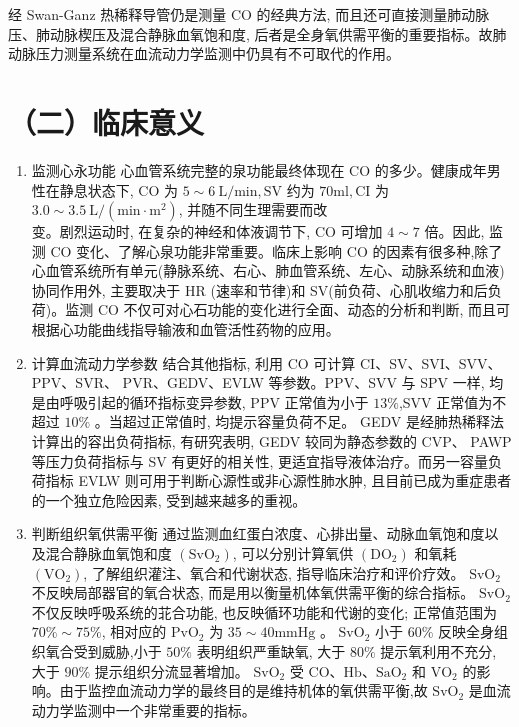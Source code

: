\documentclass[10pt]{article}
\begin{document}
经 Swan-Ganz 热稀释导管仍是测量 CO 的经典方法, 而且还可直接测量肺动脉压、肺动脉楔压及混合静脉血氧饱和度, 后者是全身氧供需平衡的重要指标。故肺动脉压力测量系统在血流动力学监测中仍具有不可取代的作用。

\section*{（二）临床意义}
\begin{enumerate}
  \item 监测心永功能 心血管系统完整的泉功能最终体现在 CO 的多少。健康成年男性在静息状态下, $\mathrm{CO}$ 为 $5 \sim 6 \mathrm{~L} / \mathrm{min}, \mathrm{SV}$ 约为 $70 \mathrm{ml}, \mathrm{CI}$ 为 $3.0 \sim 3.5 \mathrm{~L} /\left(\mathrm{min} \cdot \mathrm{m}^{2}\right)$, 并随不同生理需要而改\\
变。剧烈运动时, 在复杂的神经和体液调节下, CO 可增加 $4 \sim 7$ 倍。因此, 监测 CO 变化、了解心泉功能非常重要。临床上影响 CO 的因素有很多种,除了心血管系统所有单元(静脉系统、右心、肺血管系统、左心、动脉系统和血液) 协同作用外, 主要取决于 $\mathrm{HR}$ (速率和节律)和 SV(前负荷、心肌收缩力和后负荷)。监测 CO 不仅可对心石功能的变化进行全面、动态的分析和判断, 而且可根据心功能曲线指导输液和血管活性药物的应用。

  \item 计算血流动力学参数 结合其他指标, 利用 CO 可计算 CI、SV、SVI、SVV、PPV、SVR、 PVR、GEDV、EVLW 等参数。PPV、SVV 与 SPV 一样, 均是由呼吸引起的循环指标变异参数, PPV 正常值为小于 $13 \%$,SVV 正常值为不超过 $10 \%$ 。当超过正常值时, 均提示容量负荷不足。 GEDV 是经肺热稀释法计算出的容出负荷指标, 有研究表明, GEDV 较同为静态参数的 CVP、 PAWP 等压力负荷指标与 SV 有更好的相关性, 更适宜指导液体治疗。而另一容量负荷指标 EVLW 则可用于判断心源性或非心源性肺水肿, 且目前已成为重症患者的一个独立危险因素, 受到越来越多的重视。

  \item 判断组织氧供需平衡 通过监测血红蛋白浓度、心排出量、动脉血氧饱和度以及混合静脉血氧饱和度 $\left(\mathrm{SvO}_{2}\right)$, 可以分别计算氧供 $\left(\mathrm{DO}_{2}\right)$ 和氧耗 $\left(\mathrm{VO}_{2}\right)$, 了解组织灌注、氧合和代谢状态, 指导临床治疗和评价疗效。 $\mathrm{SvO}_{2}$ 不反映局部器官的氧合状态, 而是用以衡量机体氧供需平衡的综合指标。 $\mathrm{SvO}_{2}$ 不仅反映呼吸系统的苝合功能, 也反映循环功能和代谢的变化; 正常值范围为 $70 \% \sim 75 \%$, 相对应的 $\mathrm{PvO}_{2}$ 为 $35 \sim 40 \mathrm{mmHg}$ 。 $\mathrm{SvO}_{2}$ 小于 $60 \%$ 反映全身组织氧合受到威胁,小于 $50 \%$ 表明组织严重缺氧, 大于 $80 \%$ 提示氧利用不充分, 大于 $90 \%$ 提示组织分流显著增加。 $\mathrm{SvO}_{2}$ 受 $\mathrm{CO} 、 \mathrm{Hb} 、 \mathrm{SaO}_{2}$ 和 $\mathrm{VO}_{2}$ 的影响。由于监控血流动力学的最终目的是维持机体的氧供需平衡,故 $\mathrm{SvO}_{2}$ 是血流动力学监测中一个非常重要的指标。

\end{enumerate}
\end{document}

